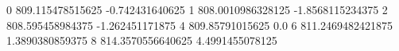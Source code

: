 0 809.115478515625 -0.742431640625
1 808.0010986328125 -1.8568115234375
2 808.595458984375 -1.262451171875
4 809.85791015625 0.0
6 811.2469482421875 1.3890380859375
8 814.3570556640625 4.4991455078125
